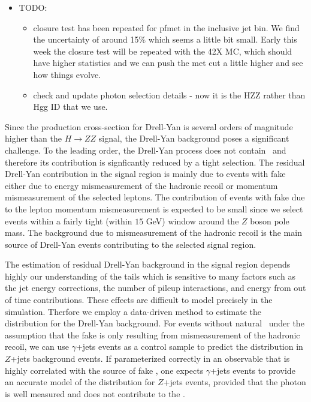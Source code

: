 
\begin{itemize}
\item TODO:
\begin{itemize}
    \item closure test has been repeated for pfmet in the inclusive jet bin.  
We find the uncertainty of around 15\% which seems a little bit small.  
Early this week the closure test will be repeated with the 42X MC, which should have
higher statistics and we can push the met cut a little higher and see how things evolve.
    \item check and update photon selection details - now it is the HZZ rather than Hgg ID that we use.
\end{itemize}
\end{itemize}

Since the production cross-section for Drell-Yan is several orders of magnitude 
higher than the $H \to ZZ$ signal, the Drell-Yan background poses a significant 
challenge. To the leading order, the Drell-Yan process does not contain \met\,  
and therefore its contribution is signficantly reduced by a tight \met selection. 
The residual Drell-Yan contribution in the signal region 
is mainly due to events with fake \met either due to energy mismeasurement of  
the hadronic recoil or momentum mismeasurement of the selected leptons. 
The contribution of events with fake \met due to the lepton momentum mismeasurement 
is expected to be small since we select events within a fairly tight (within $15$ GeV) window 
around the $Z$ boson pole mass. The background due to mismeasurement of the hadronic
recoil is the main source of Drell-Yan events contributing to the selected signal region.

The estimation of residual Drell-Yan background in the signal region depends highly 
our understanding of the \met tails which is sensitive to many factors such as 
the jet energy corrections, the number of pileup interactions, and energy from out of time
contributions. These effects are difficult to model precisely in the simulation.
Therfore we employ a data-driven method to estimate the \met distribution for the 
Drell-Yan background. For events without natural \met\, under the assumption that 
the fake \met is only resulting from mismeasurement of the hadronic recoil, we can use
$\gamma$+jets events as a control sample to predict the \met distribution in $Z$+jets
background events. If parameterized correctly in an observable that is highly correlated 
with the source of fake \met, one expects $\gamma$+jets events to provide an accurate
model of the \met distribution for $Z$+jets events, provided that the photon
is well measured and does not contribute to the \met.

